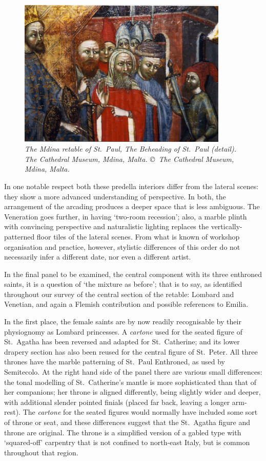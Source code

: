 \documentclass[a4paper,12pt]{article}
\begin{document}
\begin{figure}[htbp]
\centering
\includegraphics[width=10cm]{pics/fig49.png}
\caption[The Mdina retable of St.~Paul, The Beheading of St.~Paul (detail)] 
{\it The Mdina retable of St.~Paul, The Beheading of St.~Paul (detail).
The Cathedral Museum, Mdina, Malta. \copyright\ The Cathedral Museum,
  Mdina, Malta.} 
\end{figure}

In one notable respect both these predella interiors differ from the
lateral scenes: they show a more advanced understanding of
perspective. In both, the arrangement of the arcading produces a
deeper space that is less ambiguous.  The Veneration goes further, in
having `two-room recession'; also, a marble plinth with convincing
perspective and naturalistic lighting replaces the
vertically-patterned floor tiles of the lateral scenes. From what is
known of workshop organisation and practice, however, stylistic
differences of this order do not necessarily infer a different date,
nor even a different artist.

In the final panel to be examined, the central component with its
three enthroned saints, it is a question of `the mixture as before';
that is to say, as identified throughout our survey of the central
section of the retable: Lombard and Venetian, and again a Flemish
contribution and possible references to Emilia.

In the first place, the female saints are by now readily recognisable
by their physiognomy as Lombard princesses. A \textit{cartone} used
for the seated figure of St.~Agatha has been reversed and adapted for
St.~Catherine; and its lower drapery section has also been reused for
the central figure of St.~Peter. All three thrones have the marble
patterning of St.~Paul Enthroned, as used by Semitecolo. At the right
hand side of the panel there are various small differences: the tonal
modelling of St.~Catherine's mantle is more sophisticated than that of
her companions; her throne is aligned differently, being slightly
wider and deeper, with additional slender pointed finials (placed far
back, leaving a longer arm-rest). The \textit{cartone} for the seated
figures would normally have included some sort of throne or seat, and
these differences suggest that the St.~Agatha figure and throne are
original. The throne is a simplified version of a gabled type with
`squared-off' carpentry that is not confined to north-east Italy, but
is common throughout that region.
\end{document}
